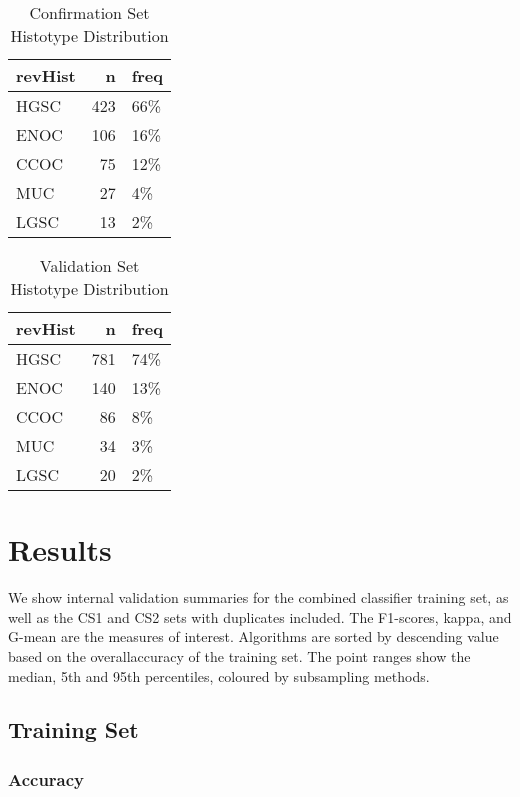 \documentclass[
]{report}
\begin{document}
\begin{table}

\caption{\label{tab:conf-hist}Confirmation Set Histotype Distribution}
\centering
\begin{tabular}[t]{l|r|l}
\hline
revHist & n & freq\\
\hline
HGSC & 423 & 66\%\\
\hline
ENOC & 106 & 16\%\\
\hline
CCOC & 75 & 12\%\\
\hline
MUC & 27 & 4\%\\
\hline
LGSC & 13 & 2\%\\
\hline
\end{tabular}
\end{table}

\begin{table}

\caption{\label{tab:val-hist}Validation Set Histotype Distribution}
\centering
\begin{tabular}[t]{l|r|l}
\hline
revHist & n & freq\\
\hline
HGSC & 781 & 74\%\\
\hline
ENOC & 140 & 13\%\\
\hline
CCOC & 86 & 8\%\\
\hline
MUC & 34 & 3\%\\
\hline
LGSC & 20 & 2\%\\
\hline
\end{tabular}
\end{table}

\hypertarget{results}{%
\chapter{Results}\label{results}}

We show internal validation summaries for the combined classifier training set, as well as the CS1 and CS2 sets with duplicates included. The F1-scores, kappa, and G-mean are the measures of interest. Algorithms are sorted by descending value based on the overallaccuracy of the training set. The point ranges show the median, 5th and 95th percentiles, coloured by subsampling methods.

\hypertarget{training-set}{%
\section{Training Set}\label{training-set}}

\hypertarget{accuracy}{%
\subsection{Accuracy}\label{accuracy}}
\end{document}

